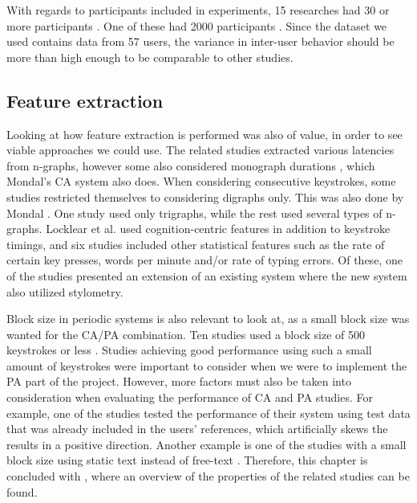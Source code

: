 With regards to participants included in experiments, 15 researches had 30 or more participants \cite{Messerman, gnp, Ahmed, superResults, KIM2017, 900words, sliding, Monrose, park, monaco, KANG201572, dowl, cognition, meaningless, stewart}.
One of these had 2000 participants \cite{900words}.
Since the dataset we used \cite{mondal} contains data from 57 users, the variance in inter-user behavior should be more than high enough to be comparable to other studies.

\subsection{Feature extraction}
Looking at how feature extraction is performed was also of value, in order to see viable approaches we could use.
The related studies extracted various latencies from n-graphs, however some also considered monograph durations \cite{Pinto2014, superResults, KIM2017, Ahmed, Monrose, Janakiraman2007, monaco, BOURS201236, chi-square, Kolakowska2011, cognition, stewart, Tappert, pohmm}, which Mondal's \cite{mondal} CA system also does.
When considering consecutive keystrokes, some studies \cite{davoudi2009, davoudi2010, KIM2017, Ahmed, Janakiraman2007, Solami, BOURS201236, Monrose, park, monaco, chi-square, markov, Harun, occ, stewart, Tappert, meaningless, fast, pohmm} restricted themselves to considering digraphs only.
This was also done by Mondal \cite{mondal}.
One study \cite{900words} used only trigraphs, while the rest used several types of n-graphs.
Locklear et al. \cite{cognition} used cognition-centric features in addition to keystroke timings,
and six studies \cite{occ, Tappert, stewart, alsultan, monaco, pohmm} included other statistical features such as the rate of certain key presses, words per minute and/or rate of typing errors.
Of these, one of the studies \cite{stewart} presented an  extension of an existing system \cite{Tappert} where the new system also utilized stylometry.

Block size in periodic systems is also relevant to look at, as a small block size was wanted for the CA/PA combination.
Ten studies used a block size of 500 keystrokes or less \cite{superResults, Messerman, Pinto2014, Ahmed, hu, park, Janakiraman2007, chi-square, markov, Harun, fast}.
Studies achieving good performance using such a small amount of keystrokes were important to consider when we were to implement the PA part of the project.
However, more factors must also be taken into consideration when evaluating the performance of CA and PA studies.
For example, one of the studies \cite{chi-square} tested the performance of their system using test data that was already included in the users' references, which artificially skews the results in a positive direction.
Another example is one of the studies with a small block size using static text instead of free-text \cite{hu}.
Therefore, this chapter is concluded with , where an overview of the properties of the related studies can be found.


